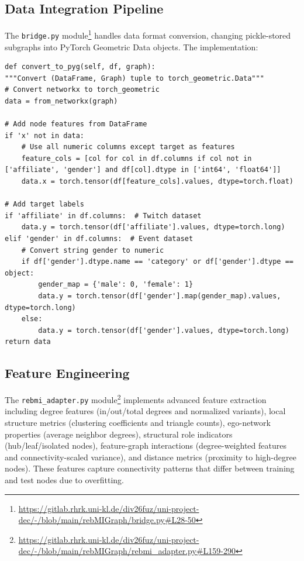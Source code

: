 \documentclass{article}
\begin{document}
\subsection{Data Integration Pipeline}
The \texttt{bridge.py} module\footnote{\url{https://gitlab.rhrk.uni-kl.de/div26fuz/uni-project-dec/-/blob/main/rebMIGraph/bridge.py\#L28-50}} handles data format conversion, changing pickle-stored subgraphs into PyTorch Geometric Data objects. The implementation:
\begin{verbatim}
def convert_to_pyg(self, df, graph):
"""Convert (DataFrame, Graph) tuple to torch_geometric.Data"""
# Convert networkx to torch_geometric
data = from_networkx(graph)

# Add node features from DataFrame
if 'x' not in data:
    # Use all numeric columns except target as features
    feature_cols = [col for col in df.columns if col not in ['affiliate', 'gender'] and df[col].dtype in ['int64', 'float64']]
    data.x = torch.tensor(df[feature_cols].values, dtype=torch.float)

# Add target labels
if 'affiliate' in df.columns:  # Twitch dataset
    data.y = torch.tensor(df['affiliate'].values, dtype=torch.long)
elif 'gender' in df.columns:  # Event dataset
    # Convert string gender to numeric
    if df['gender'].dtype.name == 'category' or df['gender'].dtype == object:
        gender_map = {'male': 0, 'female': 1}
        data.y = torch.tensor(df['gender'].map(gender_map).values, dtype=torch.long)
    else:
        data.y = torch.tensor(df['gender'].values, dtype=torch.long)
return data
\end{verbatim}

\subsection{Feature Engineering}
The \texttt{rebmi\_adapter.py} module\footnote{\url{https://gitlab.rhrk.uni-kl.de/div26fuz/uni-project-dec/-/blob/main/rebMIGraph/rebmi_adapter.py\#L159-290}} implements advanced feature extraction including degree features (in/out/total degrees and normalized variants), local structure metrics (clustering coefficients and triangle counts), ego-network properties (average neighbor degrees), structural role indicators (hub/leaf/isolated nodes), feature-graph interactions (degree-weighted features and connectivity-scaled variance), and distance metrics (proximity to high-degree nodes). These features capture connectivity patterns that differ between training and test nodes due to overfitting.
\end{document}
